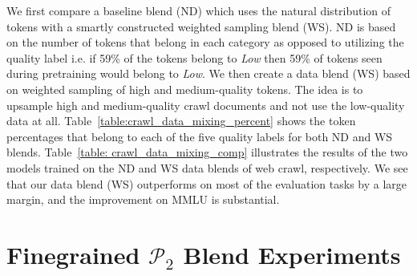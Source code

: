 \documentclass[11pt]{article}
\newcommand{\phasetwo}{$\mathcal{P}_2$\xspace}
\begin{document}
We first compare a baseline blend (ND) which uses the natural distribution of tokens with a smartly constructed weighted sampling blend (WS).
ND is based on the number of tokens that belong in each category as opposed to utilizing the quality label 
i.e. if 59\% of the tokens belong to \textit{Low} then 59\% of tokens seen during pretraining would belong to \textit{Low}.
We then create a data blend (WS) based on weighted sampling of high and medium-quality tokens.
The idea is to upsample high and medium-quality crawl documents and not use the low-quality data at all.
Table~\ref{table:crawl_data_mixing_percent} shows the token percentages that belong to each of the five quality labels for both ND and WS blends.
Table~\ref{table: crawl_data_mixing_comp} illustrates the results of the two models trained on the ND and WS data blends of web crawl, respectively. 
We see that our data blend (WS) outperforms on most of the evaluation tasks by a large margin, and the improvement on MMLU is substantial. %

\begin{table}[]
\centering
{}
\caption{Our \textit{WS}: weighted sampling data mixing method outperforms the \textit{ND}: natural distribution method.}
\label{table: crawl_data_mixing_comp}
\end{table}


\section{Finegrained \phasetwo Blend Experiments}
\label{app:finegrained_upsampling_exps}
\end{document}
